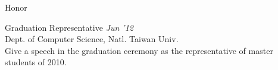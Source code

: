 \documentclass{resume} %
\begin{document}

\begin{rSection}{Honor}

\item Graduation Representative \hfill {\em Jun '12} \\
Dept. of Computer Science, Natl. Taiwan Univ. \\
Give a speech in the graduation ceremony as the representative of master students of 2010.

\end{rSection}


\end{document}
